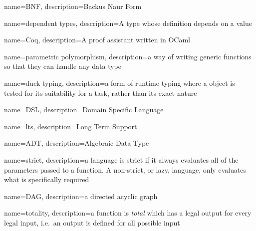 {%
    name=BNF,
    description={Backus Naur Form}
}

{%
    name={dependent types},
    description={A type whose definition depends on a value}
}

{%
    name=Coq,
    description={A proof assistant written in OCaml}
}

{%
    name={parametric polymorphism},
    description={a way of writing generic functions so that they can handle any data type}
}

{%
    name={duck typing},
    description={a form of runtime typing where a object is tested for its suitability for a task,
    rather than its exact nature}
}

{%
    name={DSL},
    description={Domain Specific Language}
}

{%
    name={lts},
    description={Long Term Support}
}

{%
    name={ADT},
    description={Algebraic Data Type}
}

{%
    name={strict},
    description={a language is strict if it always evaluates all of the parameters passed to a
    function. A non-strict, or lazy, language, only evaluates what is specifically required}
}

{%
    name={DAG},
    description={a directed acyclic graph}
}

{%
    name={totality},
    description={a function is \textit{total} which has a legal output for every legal input, i.e.\ an output is
    defined for all possible input}
}
